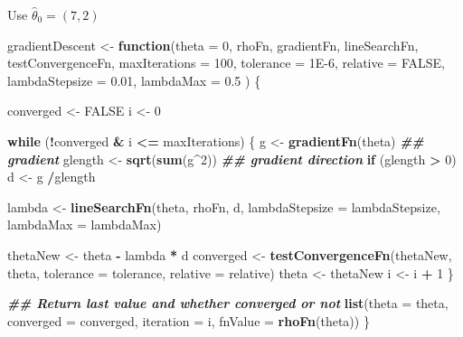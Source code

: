 \documentclass[
]{article}
\newenvironment{Shaded}{\begin{snugshade}}{\end{snugshade}}
\newcommand{\AttributeTok}[1]{\textcolor[rgb]{0.13,0.29,0.53}{#1}}
\newcommand{\ConstantTok}[1]{\textcolor[rgb]{0.56,0.35,0.01}{#1}}
\newcommand{\ControlFlowTok}[1]{\textcolor[rgb]{0.13,0.29,0.53}{\textbf{#1}}}
\newcommand{\DecValTok}[1]{\textcolor[rgb]{0.00,0.00,0.81}{#1}}
\newcommand{\DocumentationTok}[1]{\textcolor[rgb]{0.56,0.35,0.01}{\textbf{\textit{#1}}}}
\newcommand{\FloatTok}[1]{\textcolor[rgb]{0.00,0.00,0.81}{#1}}
\newcommand{\FunctionTok}[1]{\textcolor[rgb]{0.13,0.29,0.53}{\textbf{#1}}}
\newcommand{\NormalTok}[1]{#1}
\newcommand{\OtherTok}[1]{\textcolor[rgb]{0.56,0.35,0.01}{#1}}
\newcommand{\SpecialCharTok}[1]{\textcolor[rgb]{0.81,0.36,0.00}{\textbf{#1}}}
\begin{document}
Use \(\hat\theta_0 = (7,2)\)

\begin{Shaded}
\begin{Highlighting}[]
\NormalTok{gradientDescent }\OtherTok{\textless{}{-}} \ControlFlowTok{function}\NormalTok{(}\AttributeTok{theta =} \DecValTok{0}\NormalTok{,}
\NormalTok{      rhoFn, gradientFn, lineSearchFn, testConvergenceFn,}
      \AttributeTok{maxIterations =} \DecValTok{100}\NormalTok{,}
      \AttributeTok{tolerance =} \FloatTok{1E{-}6}\NormalTok{, }\AttributeTok{relative =} \ConstantTok{FALSE}\NormalTok{,}
      \AttributeTok{lambdaStepsize =} \FloatTok{0.01}\NormalTok{, }\AttributeTok{lambdaMax =} \FloatTok{0.5}\NormalTok{ ) \{}

\NormalTok{  converged }\OtherTok{\textless{}{-}} \ConstantTok{FALSE}
\NormalTok{  i }\OtherTok{\textless{}{-}} \DecValTok{0}

  \ControlFlowTok{while}\NormalTok{ (}\SpecialCharTok{!}\NormalTok{converged }\SpecialCharTok{\&}\NormalTok{ i }\SpecialCharTok{\textless{}=}\NormalTok{ maxIterations) \{}
\NormalTok{    g }\OtherTok{\textless{}{-}} \FunctionTok{gradientFn}\NormalTok{(theta) }\DocumentationTok{\#\# gradient}
\NormalTok{    glength }\OtherTok{\textless{}{-}}  \FunctionTok{sqrt}\NormalTok{(}\FunctionTok{sum}\NormalTok{(g}\SpecialCharTok{\^{}}\DecValTok{2}\NormalTok{)) }\DocumentationTok{\#\# gradient direction}
    \ControlFlowTok{if}\NormalTok{ (glength }\SpecialCharTok{\textgreater{}} \DecValTok{0}\NormalTok{) d }\OtherTok{\textless{}{-}}\NormalTok{ g }\SpecialCharTok{/}\NormalTok{glength}

\NormalTok{    lambda }\OtherTok{\textless{}{-}} \FunctionTok{lineSearchFn}\NormalTok{(theta, rhoFn, d,}
                \AttributeTok{lambdaStepsize =}\NormalTok{ lambdaStepsize, }\AttributeTok{lambdaMax =}\NormalTok{ lambdaMax)}

\NormalTok{    thetaNew }\OtherTok{\textless{}{-}}\NormalTok{ theta }\SpecialCharTok{{-}}\NormalTok{ lambda }\SpecialCharTok{*}\NormalTok{ d}
\NormalTok{    converged }\OtherTok{\textless{}{-}} \FunctionTok{testConvergenceFn}\NormalTok{(thetaNew, theta,}
                                   \AttributeTok{tolerance =}\NormalTok{ tolerance,}
                                   \AttributeTok{relative =}\NormalTok{ relative)}
\NormalTok{    theta }\OtherTok{\textless{}{-}}\NormalTok{ thetaNew}
\NormalTok{    i }\OtherTok{\textless{}{-}}\NormalTok{ i }\SpecialCharTok{+} \DecValTok{1}
\NormalTok{  \}}

  \DocumentationTok{\#\# Return last value and whether converged or not}
  \FunctionTok{list}\NormalTok{(}\AttributeTok{theta =}\NormalTok{ theta, }\AttributeTok{converged =}\NormalTok{ converged, }\AttributeTok{iteration =}\NormalTok{ i, }\AttributeTok{fnValue =} \FunctionTok{rhoFn}\NormalTok{(theta))}
\NormalTok{\}}
\end{Highlighting}
\end{Shaded}
\end{document}
